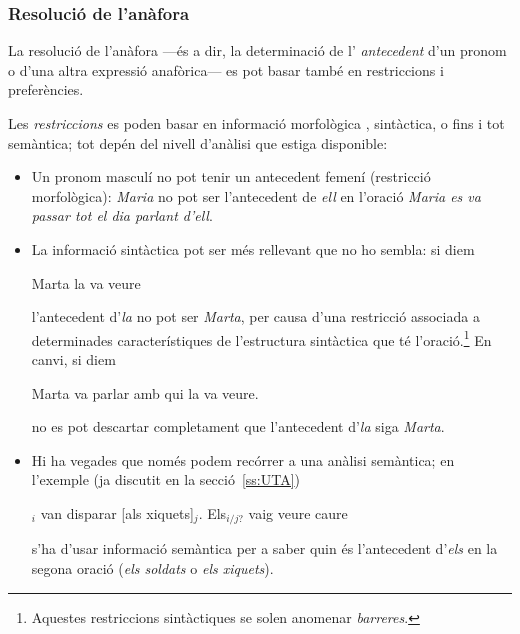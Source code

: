 \subsubsection{Resolució de l'anàfora}

La resolució de l'anàfora ---és a dir, la determinació de l'{\em
  antecedent} d'un pronom o d'una altra expressió anafòrica--- es pot
basar també en restriccions i preferències. 

Les \emph{restriccions} es poden basar en informació morfològica ,
sintàctica, o fins i tot semàntica; tot depén del nivell d'anàlisi que
estiga disponible:
\begin{itemize}
\item Un pronom masculí no pot tenir un antecedent femení (restricció
  morfològica): \emph{Maria} no pot ser l'antecedent de \emph{ell} en
  l'oració \emph{Maria es va passar tot el dia parlant d'ell}.
\item La informació sintàctica pot ser més rellevant que no ho sembla:
  si diem
  \begin{exemple}Marta la va veure\end{exemple} l'antecedent
  d'\emph{la} no pot ser \emph{Marta}, per causa d'una restricció
  associada a determinades característiques de l'estructura sintàctica
  que té l'oració.\footnote{Aquestes restriccions sintàctiques se
    solen anomenar \emph{barreres}.}  En canvi, si diem
  \begin{exemple}Marta va parlar amb qui la va veure.\end{exemple} no
  es pot descartar completament que l'antecedent d'\emph{la} siga
  \emph{Marta}.
\item Hi ha vegades que només podem recórrer a una anàlisi semàntica;
  en l'exemple (ja discutit en la secció~\ref{ss:UTA})
\begin{exemple}
$_i$ van disparar [als xiquets]$_j$. Els$_{i/j?}$
vaig veure caure
\end{exemple}
s'ha d'usar informació semàntica per a saber quin és l'antecedent
d'\emph{els} en la segona oració (\emph{els soldats} o \emph{els
  xiquets}).
\end{itemize}

